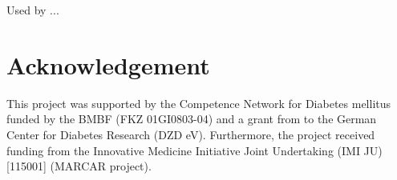 \documentclass[final,5p,times,twocolumn]{elsarticle}
\begin{document}
Used by ... \cite{Gispert2013}

\section{Acknowledgement}
This project was supported by the Competence Network for Diabetes mellitus funded
by the BMBF (FKZ 01GI0803-04) and a grant from to the German Center for Diabetes Research (DZD eV). Furthermore, the project received funding from the Innovative Medicine Initiative Joint Undertaking (IMI JU) [115001] (MARCAR project).














\end{document}

